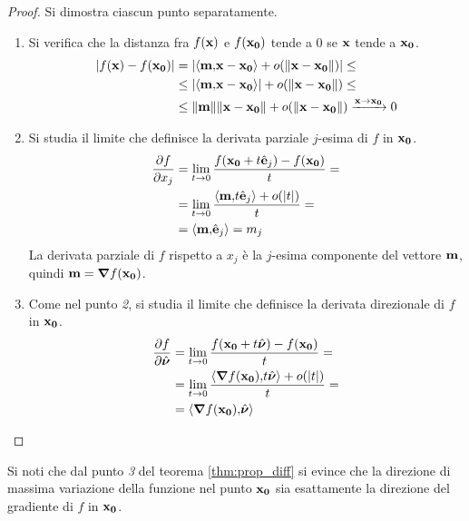 \begin{proof}
    Si dimostra ciascun punto separatamente.
    \begin{enumerate}
        \item Si verifica che la distanza fra $f(\vb{x})$ e $f(\vb{x_0})$ tende a $0$ se $\vb{x}$ tende a $\vb{x_0}$.
        \begin{align*}
            \abs{f(\vb{x})-f(\vb{x_0})}&=\abs{\left\langle\vb{m}{,}\vb{x}-\vb{x_0}\right\rangle+o(\norm{\vb{\vb{x}-\vb{x_0}}})}\leq\\
            &\leq\abs{\left\langle\vb{m}{,}\vb{\vb{x}-\vb{x_0}}\right\rangle}+o(\norm{\vb{\vb{x}-\vb{x_0}}})\leq\\
            &\leq\norm{\vb{m}}\norm{\vb{x}-\vb{x_0}}+o(\norm{\vb{x}-\vb{x_0}})\xrightarrow{\vb{x}\to\vb{x_0}} 0
        \end{align*}

        \item Si studia il limite che definisce la derivata parziale $j$-esima di $f$ in $\vb{x_0}$.
        \begin{align*}
            \frac{\partial f}{\partial x_j}&=\lim_{t\to 0}\frac{f(\vb{x_0}+t\hat{\vb{e}}_j)-f(\vb{x_0})}{t}=\\
            &=\lim_{t\to 0}\frac{\left\langle\vb{m}{,}t\hat{\vb{e}}_j\right\rangle + o(\abs{t})}{t}=\\
            &=\left\langle\vb{m}{,}\hat{\vb{e}}_j\right\rangle=m_j
        \end{align*}
        La derivata parziale di $f$ rispetto a $x_j$ è la $j$-esima componente del vettore $\vb{m}$, quindi $\vb{m}=\grad f(\vb{x_0})$.

        \item Come nel punto \textit{2}, si studia il limite che definisce la derivata direzionale di $f$ in $\vb{x_0}$.
        \begin{align*}
            \frac{\partial f}{\partial \hat{\bm \nu}}&=\lim_{t\to 0}\frac{f(\vb{x_0}+t\hat{\bm \nu})-f(\vb{x_0})}{t}=\\
            &=\lim_{t\to 0}\frac{\left\langle\grad f(\vb{x_0}){,}t\hat{\bm \nu}\right\rangle + o(\abs{t})}{t}=\\
            &=\left\langle\grad f(\vb{x_0}){,}\hat{\bm \nu}\right\rangle
        \end{align*}
    \end{enumerate}
\end{proof}

\begin{remark}
    Si noti che dal punto \textit{3} del teorema \ref{thm:prop_diff} si evince che la direzione di massima variazione della funzione nel punto $\vb{x_0}$ sia esattamente la direzione del gradiente di $f$ in $\vb{x_0}$.
\end{remark}

